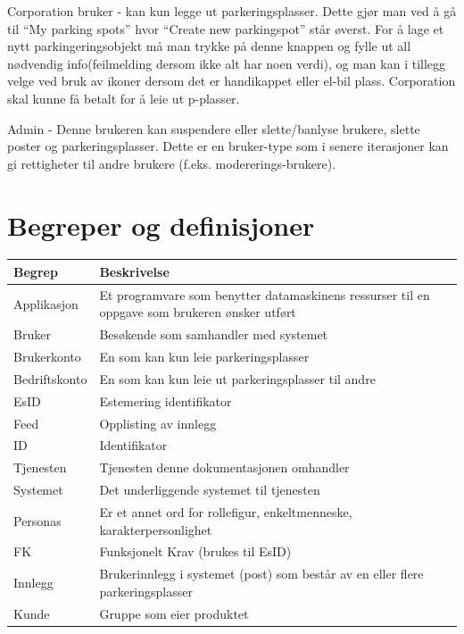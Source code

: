 \documentclass[12pt]{article}
\begin{document}
Corporation bruker - kan kun legge ut parkeringsplasser. Dette gjør man ved å gå til “My parking spots” hvor “Create new parkingspot” står øverst. For å lage et nytt parkingeringsobjekt må man trykke på denne knappen og fylle ut all nødvendig info(feilmelding dersom ikke alt har noen verdi), og man kan i tillegg velge ved bruk av ikoner dersom det er handikappet eller el-bil plass. Corporation skal kunne få betalt for å leie ut p-plasser.

Admin - Denne brukeren kan suspendere eller slette/banlyse brukere, slette poster og parkeringsplasser. Dette er en bruker-type som i senere iterasjoner kan gi rettigheter til andre brukere (f.eks. modererings-brukere).


\section{Begreper og definisjoner}

\begin{center}
    \begin{tabular}{|p{4cm}|p{12cm}| } 
        \hline
        \bf Begrep & \bf Beskrivelse \\
        \hline
        Applikasjon &  Et programvare som benytter datamaskinens ressurser til en oppgave som brukeren ønsker utført \\
        \hline
        Bruker & Besøkende som samhandler med systemet \\
        \hline
        Brukerkonto & En som kan kun leie parkeringsplasser \\
        \hline
        Bedriftskonto & En som kan kun leie ut parkeringsplasser til andre \\
        \hline
        EsID & Estemering identifikator \\
        \hline
        Feed & Opplisting av innlegg \\
        \hline
        ID & Identifikator \\
        \hline
        Tjenesten & Tjenesten denne dokumentasjonen omhandler \\
        \hline
        Systemet & Det underliggende systemet til tjenesten \\
        \hline
        Personas & Er et annet ord for rollefigur, enkeltmenneske, karakterpersonlighet\\
        \hline
        FK & Funksjonelt Krav (brukes til EsID)\\
        \hline
        Innlegg & Brukerinnlegg i systemet (post) som består av en eller flere parkeringsplasser\\
        \hline
        Kunde & Gruppe som eier produktet\\
        \hline
    \end{tabular}
\end{center}
\end{document}
